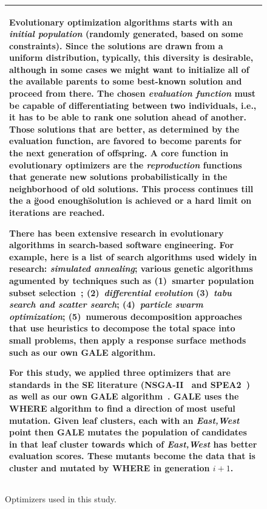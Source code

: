 \documentclass{sig-alternative}
\begin{document}
\begin{figure}[!t]
\begin{tabular}{|p{.95\linewidth}|}\hline
Evolutionary optimization algorithms
starts with an \textit{initial population} (randomly generated, based on some constraints). Since the solutions are drawn from a uniform distribution, typically, this diversity is desirable, although in some cases we might want to initialize all of the available parents to some best-known solution and proceed from there. The chosen \textit{evaluation function} must be capable of differentiating
between two individuals, i.e., it has to be able to rank one solution ahead
of another. Those solutions that are better, as determined by the evaluation
function, are favored to become parents for the next generation of offspring. 
A core function in evolutionary optimizers are the
\textit{reproduction} functions that generate   new solutions  probabilistically in the neighborhood of old solutions. This process continues till the a \"good enough\" solution is achieved or a hard limit on iterations are reached.  
    
    There has been extensive research in evolutionary algorithms in search-based software engineering.  For example, here is a list of search algorithms used widely in research: \textit{simulated annealing}\cite{bell2013limited, menzies2007business}; various genetic algorithms\cite{goldberg1979complexity} agumented by techniques such as
    (1)~smarter population subset selection~\cite{zit02,deb00afast};
    (2)~\textit{differential evolution} \cite{storn1997differential}
    (3)~\textit{tabu search and scatter search}\cite{nebro2008abyss, molina2007sspmo, glover1986general, beausoleil2006moss}; 
    (4)~\textit{particle swarm optimization}\cite{pan2008particle}; 
    (5)~numerous decomposition approaches that use heuristics to decompose the total space into small problems, then apply a response surface methods such
    as our own GALE\cite{krall2014gale,zuluaga2013active} algorithm.
    
    For this study, we applied three optimizers that are standards
    in the SE literature (NSGA-II~\cite{deb00afast} and SPEA2~\cite{zit02})
    as well as our own GALE algorithm~\cite{krall2014gale}.
    GALE uses the WHERE algorithm to find a direction of most useful
    mutation. Given leaf clusters, each with an {\em East,West} point
    then 
    GALE mutates the population of candidates in that leaf cluster towards
    which of {\em East,West} has better evaluation scores. These
    mutants become the data  that is cluster
    and mutated by WHERE in  generation $i+1$.
    \\\hline
\end{tabular}
\caption{Optimizers used in this study.}\label{fig:opt}
\end{figure}
\end{document}
